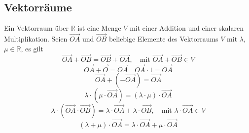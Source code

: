 \subsection{Vektorräume}
Ein Vektorraum über $\mathbb{R}$ ist eine Menge $V$ mit einer Addition und einer skalaren Multiplikation. Seien $\overrightarrow{OA}$ und $\overrightarrow{OB}$ beliebige Elemente des Vektorraums $V$ mit $\lambda$, $\mu\in \mathbb{R}$, es gilt
\begin{equation}
\boxed{\overrightarrow{OA}+\overrightarrow{OB}=\overrightarrow{OB}+\overrightarrow{OA},\quad \text{mit }\overrightarrow{OA}+\overrightarrow{OB}\in V}
\end{equation}
\begin{equation}
\boxed{\overrightarrow{OA}+\overrightarrow{O}=\overrightarrow{OA}}\quad \boxed{\overrightarrow{OA}\cdot 1=\overrightarrow{OA}}
\end{equation}
\begin{equation}
\boxed{\overrightarrow{OA}+\left(-\overrightarrow{OA}\right)=\overrightarrow{OA}}
\end{equation}
\begin{equation}
\boxed{\lambda\cdot\left(\mu\cdot \overrightarrow{OA}\right)=\left(\lambda\cdot \mu\right)\cdot \overrightarrow{OA}}
\end{equation}
\begin{equation}
\boxed{\lambda\cdot \left(\overrightarrow{OA}\cdot \overrightarrow{OB}\right)=\lambda\cdot \overrightarrow{OA}+\lambda\cdot \overrightarrow{OB},\quad \text{mit }\lambda\cdot \overrightarrow{OA}\in V}
\end{equation}
\begin{equation}
\boxed{\left(\lambda+\mu\right)\cdot \overrightarrow{OA}=\lambda\cdot \overrightarrow{OA}+\mu\cdot \overrightarrow{OA}}
\end{equation}
